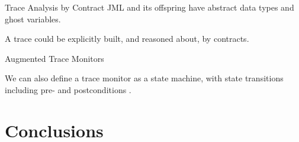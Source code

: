 \documentclass[12pt]{beamer}
\begin{document}
\begin{frame}{Trace Analysis by Contract}
  JML and its offspring have abstract data types and ghost variables.

  \vspace{0.25cm}

  A trace could be explicitly built, and reasoned about, by contracts.
\end{frame}

\begin{frame}{Augmented Trace Monitors}

  We can also define a trace monitor as a state machine, with state
  transitions including pre- and postconditions \parencite{unified}.

  \begin{center}
  \end{center}
\end{frame}


\section{Conclusions}
\label{sec:conc}
\end{document}
